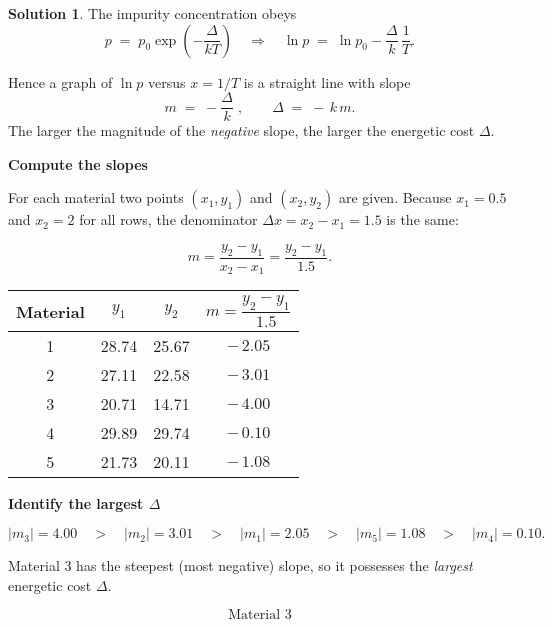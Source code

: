 \documentclass[12pt]{article}
\theoremstyle{definition} %
\newtheorem{solution}{Solution}
\theoremstyle{plain} %
\begin{document}
      \begin{solution}
        The impurity concentration obeys
        \[
        p \;=\; p_0 \exp\!\left(-\frac{\Delta}{kT}\right)
        \quad\Longrightarrow\quad
        \ln p \;=\; \ln p_0 - \frac{\Delta}{k}\,\frac{1}{T}.
        \]
        
        Hence a graph of \(\ln p\) versus \(x = 1/T\) is a straight line with slope
        \[
        m \;=\; -\frac{\Delta}{k}\;,
        \qquad
        \Delta \;=\; -\,k\,m.
        \]
        The larger the magnitude of the \emph{negative} slope, the larger the energetic
        cost \(\Delta\).
        
        \bigskip
        \textbf{Compute the slopes}
        
        For each material two points \((x_1,y_1)\) and \((x_2,y_2)\) are given.
        Because \(x_1 = 0.5\) and \(x_2 = 2\) for all rows, the denominator
        \(\Delta x = x_2-x_1 = 1.5\) is the same:
        
        \[
        m = \frac{y_2 - y_1}{x_2 - x_1}
            = \frac{y_2 - y_1}{1.5}.
        \]
        
        \begin{center}
        \begin{tabular}{c|c|c|c}
        \textbf{Material} & \(y_1\) & \(y_2\) & \(m = \dfrac{y_2 - y_1}{1.5}\) \\
        \hline
        1 & 28.74 & 25.67 & \(-\,2.05\) \\
        2 & 27.11 & 22.58 & \(-\,3.01\) \\
        3 & 20.71 & 14.71 & \(-\,4.00\) \\
        4 & 29.89 & 29.74 & \(-\,0.10\) \\
        5 & 21.73 & 20.11 & \(-\,1.08\)
        \end{tabular}
        \end{center}
        
        \bigskip
        \textbf{Identify the largest \(\Delta\)}
        
        \[
        \lvert m_3\rvert = 4.00
        \quad>\quad
        \lvert m_2\rvert = 3.01
        \quad>\quad
        \lvert m_1\rvert = 2.05
        \quad>\quad
        \lvert m_5\rvert = 1.08
        \quad>\quad
        \lvert m_4\rvert = 0.10.
        \]
        
        Material \(3\) has the steepest (most negative) slope, so it possesses
        the \emph{largest} energetic cost \(\Delta\).
        
        \[
        \boxed{\text{Material 3}}
        \]
        \end{solution}
\end{document}
